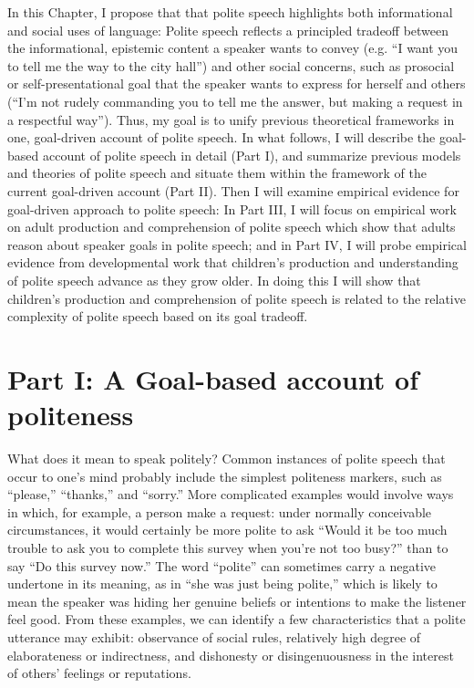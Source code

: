 \documentclass[oneside]{report}
\begin{document}
In this Chapter, I propose that that polite speech highlights both
informational and social uses of language: Polite speech reflects a
principled tradeoff between the informational, epistemic content a
speaker wants to convey (e.g. ``I want you to tell me the way to the
city hall'') and other social concerns, such as prosocial or
self-presentational goal that the speaker wants to express for herself
and others (``I'm not rudely commanding you to tell me the answer, but
making a request in a respectful way''). Thus, my goal is to unify
previous theoretical frameworks in one, goal-driven account of polite
speech. In what follows, I will describe the goal-based account of
polite speech in detail (Part I), and summarize previous models and
theories of polite speech and situate them within the framework of the
current goal-driven account (Part II). Then I will examine empirical
evidence for goal-driven approach to polite speech: In Part III, I will
focus on empirical work on adult production and comprehension of polite
speech which show that adults reason about speaker goals in polite
speech; and in Part IV, I will probe empirical evidence from
developmental work that children's production and understanding of
polite speech advance as they grow older. In doing this I will show that
children's production and comprehension of polite speech is related to
the relative complexity of polite speech based on its goal tradeoff.

\section{Part I: A Goal-based account of
politeness}\label{part-i-a-goal-based-account-of-politeness}

What does it mean to speak politely? Common instances of polite speech
that occur to one's mind probably include the simplest politeness
markers, such as ``please,'' ``thanks,'' and ``sorry.'' More complicated
examples would involve ways in which, for example, a person make a
request: under normally conceivable circumstances, it would certainly be
more polite to ask ``Would it be too much trouble to ask you to complete
this survey when you're not too busy?'' than to say ``Do this survey
now.'' The word ``polite'' can sometimes carry a negative undertone in
its meaning, as in ``she was just being polite,'' which is likely to
mean the speaker was hiding her genuine beliefs or intentions to make
the listener feel good. From these examples, we can identify a few
characteristics that a polite utterance may exhibit: observance of
social rules, relatively high degree of elaborateness or indirectness,
and dishonesty or disingenuousness in the interest of others' feelings
or reputations.
\end{document}

